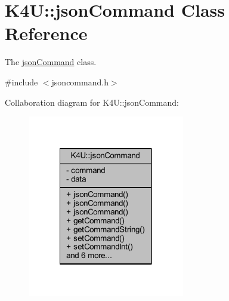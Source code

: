 \hypertarget{class_k4_u_1_1json_command}{\section{K4\-U\-:\-:json\-Command Class Reference}
\label{d2/dc1/class_k4_u_1_1json_command}
}


The \hyperlink{class_k4_u_1_1json_command}{json\-Command} class.  




{\ttfamily \#include $<$jsoncommand.\-h$>$}



Collaboration diagram for K4\-U\-:\-:json\-Command\-:\nopagebreak
\begin{figure}[H]
\begin{center}
\leavevmode
\includegraphics[width=194pt]{d0/d94/class_k4_u_1_1json_command__coll__graph}
\end{center}
\end{figure}
